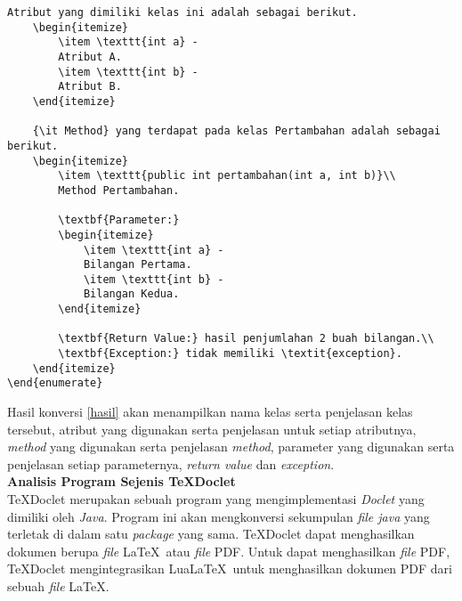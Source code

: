 \documentclass[a4paper,twoside]{article}
\begin{document}
\begin{enumerate}
\begin{enumerate}
\begin{lstlisting}[caption=Hasil konversi {\it Javadoc} ke \LaTeX, label={hasil}]
	Atribut yang dimiliki kelas ini adalah sebagai berikut.
	\begin{itemize}
		\item \texttt{int a} -
		Atribut A.
		\item \texttt{int b} -
		Atribut B.
	\end{itemize}
	
	{\it Method} yang terdapat pada kelas Pertambahan adalah sebagai berikut.
	\begin{itemize}
		\item \texttt{public int pertambahan(int a, int b)}\\
		Method Pertambahan.
		
		\textbf{Parameter:}
		\begin{itemize}
			\item \texttt{int a} - 
			Bilangan Pertama.
			\item \texttt{int b} - 
			Bilangan Kedua.
		\end{itemize}
		
		\textbf{Return Value:} hasil penjumlahan 2 buah bilangan.\\
		\textbf{Exception:} tidak memiliki \textit{exception}.
	\end{itemize}
\end{enumerate}
\end{lstlisting}

Hasil konversi \ref{hasil} akan menampilkan nama kelas serta penjelasan kelas tersebut, atribut yang digunakan serta penjelasan untuk setiap atributnya, {\it method} yang digunakan serta penjelasan {\it method}, parameter yang digunakan serta penjelasan setiap parameternya, {\it return value} dan {\it exception}.\\

\textbf{Analisis Program Sejenis TeXDoclet}\\
TeXDoclet merupakan sebuah program yang mengimplementasi {\it Doclet} yang dimiliki oleh {\it Java}. Program ini akan mengkonversi sekumpulan {\it file java} yang terletak di dalam satu {\it package} yang sama. TeXDoclet dapat menghasilkan dokumen berupa {\it file} \LaTeX\ atau {\it file} PDF. Untuk dapat menghasilkan {\it file} PDF, TeXDoclet mengintegrasikan Lua\LaTeX\ untuk menghasilkan dokumen PDF dari sebuah {\it file} \LaTeX.


\end{enumerate}
\end{enumerate}
\end{document}
